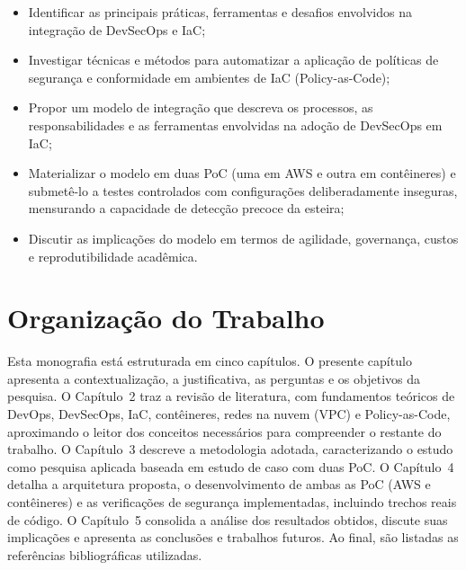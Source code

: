 \begin{itemize}
    \item Identificar as principais práticas, ferramentas e desafios envolvidos na integração de DevSecOps e IaC;
    \item Investigar técnicas e métodos para automatizar a aplicação de políticas de segurança e conformidade em ambientes de IaC (Policy-as-Code);
    \item Propor um modelo de integração que descreva os processos, as responsabilidades e as ferramentas envolvidas na adoção de DevSecOps em IaC;
    \item Materializar o modelo em duas PoC (uma em AWS e outra em contêineres) e submetê-lo a testes controlados com configurações deliberadamente inseguras, mensurando a capacidade de detecção precoce da esteira;
    \item Discutir as implicações do modelo em termos de agilidade, governança, custos e reprodutibilidade acadêmica.
\end{itemize}

\section{Organização do Trabalho}

Esta monografia está estruturada em cinco capítulos. O presente capítulo apresenta a contextualização, a justificativa, as perguntas e os objetivos da pesquisa. O Capítulo~2 traz a revisão de literatura, com fundamentos teóricos de DevOps, DevSecOps, IaC, contêineres, redes na nuvem (VPC) e Policy-as-Code, aproximando o leitor dos conceitos necessários para compreender o restante do trabalho. O Capítulo~3 descreve a metodologia adotada, caracterizando o estudo como pesquisa aplicada baseada em estudo de caso com duas PoC. O Capítulo~4 detalha a arquitetura proposta, o desenvolvimento de ambas as PoC (AWS e contêineres) e as verificações de segurança implementadas, incluindo trechos reais de código. O Capítulo~5 consolida a análise dos resultados obtidos, discute suas implicações e apresenta as conclusões e trabalhos futuros. Ao final, são listadas as referências bibliográficas utilizadas.

